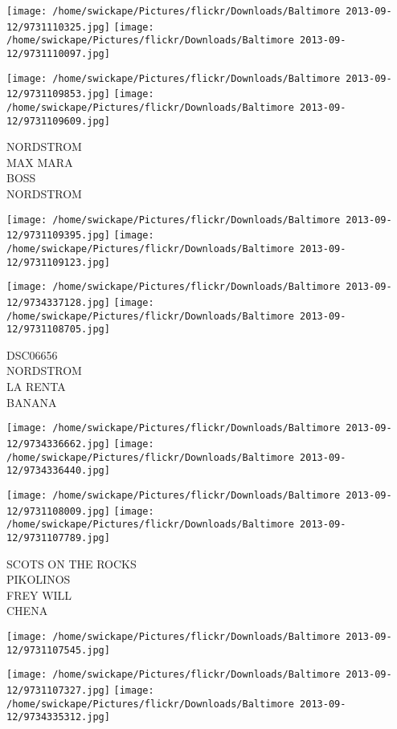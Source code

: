 \documentclass[10pt,letterpaper]{article}
\begin{document}
\texttt{[image: /home/swickape/Pictures/flickr/Downloads/Baltimore 2013-09-12/9731110325.jpg]}
\texttt{[image: /home/swickape/Pictures/flickr/Downloads/Baltimore 2013-09-12/9731110097.jpg]}

\texttt{[image: /home/swickape/Pictures/flickr/Downloads/Baltimore 2013-09-12/9731109853.jpg]}
\texttt{[image: /home/swickape/Pictures/flickr/Downloads/Baltimore 2013-09-12/9731109609.jpg]}

NORDSTROM\\
MAX MARA\\
BOSS\\
NORDSTROM\\
\pagebreak

\texttt{[image: /home/swickape/Pictures/flickr/Downloads/Baltimore 2013-09-12/9731109395.jpg]}
\texttt{[image: /home/swickape/Pictures/flickr/Downloads/Baltimore 2013-09-12/9731109123.jpg]}

\texttt{[image: /home/swickape/Pictures/flickr/Downloads/Baltimore 2013-09-12/9734337128.jpg]}
\texttt{[image: /home/swickape/Pictures/flickr/Downloads/Baltimore 2013-09-12/9731108705.jpg]}

DSC06656\\
NORDSTROM\\
LA RENTA\\
BANANA\\
\pagebreak

\texttt{[image: /home/swickape/Pictures/flickr/Downloads/Baltimore 2013-09-12/9734336662.jpg]}
\texttt{[image: /home/swickape/Pictures/flickr/Downloads/Baltimore 2013-09-12/9734336440.jpg]}

\texttt{[image: /home/swickape/Pictures/flickr/Downloads/Baltimore 2013-09-12/9731108009.jpg]}
\texttt{[image: /home/swickape/Pictures/flickr/Downloads/Baltimore 2013-09-12/9731107789.jpg]}

SCOTS ON THE ROCKS\\
PIKOLINOS\\
FREY WILL\\
CHENA\\
\pagebreak

\texttt{[image: /home/swickape/Pictures/flickr/Downloads/Baltimore 2013-09-12/9731107545.jpg]}

\vspace{0.25in}
\texttt{[image: /home/swickape/Pictures/flickr/Downloads/Baltimore 2013-09-12/9731107327.jpg]}
\texttt{[image: /home/swickape/Pictures/flickr/Downloads/Baltimore 2013-09-12/9734335312.jpg]}
\end{document}

